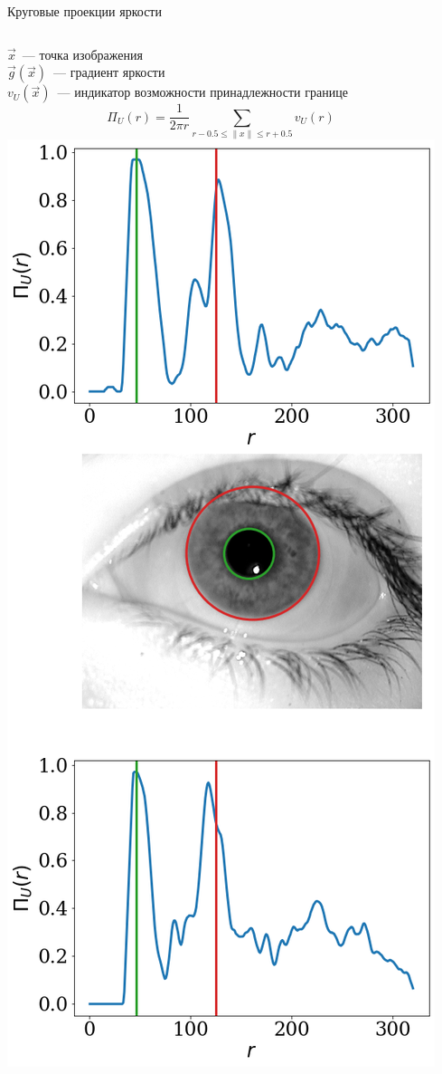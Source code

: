 \documentclass{beamer}
\begin{document}
\begin{frame}{Круговые проекции яркости}
\begin{columns}[c]
		$\vec{x}$~--- точка изображения\\ 
		$\vec{g}(\vec{x})$~--- градиент яркости\\
		$v_U(\vec{x})$~--- индикатор возможности принадлежности границе
		\[
		\Pi_U(r) = \frac{1}{2\pi r} \sum_{r-0.5 \leqslant \| x \| \leqslant r + 0.5} v_U(r)
		\]
    \includegraphics[scale=0.2]{img/eye.png}
\end{columns}

\end{frame}
\end{document}
